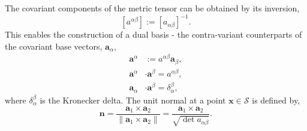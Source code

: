 \documentclass[../main.tex]{subfiles}
\begin{document}
The covariant components of the metric tensor can be obtained by its inversion,
\begin{equation}\label{contravar_metric_def}
    [a^{\alpha \beta}] := [a_{\alpha \beta}]^{-1}.
\end{equation}
This enables the construction of a dual basis - the contra-variant counterparts of the covariant base vectors, $\boldsymbol{a}_{\alpha}$,
\begin{align}\label{contravar_def}
    \boldsymbol{a}^{\alpha} &:= a^{\alpha \beta} \boldsymbol{a}_{\beta},\\
    \boldsymbol{a}^{\alpha} &\cdot \boldsymbol{a}^{\beta} = a^{\alpha \beta},\\
    \boldsymbol{a}_{\alpha} &\cdot \boldsymbol{a}^{\beta} = \delta^{\beta}_{\alpha},
\end{align}
where $\delta^{\beta}_{\alpha}$ is the Kronecker delta.
%
The unit normal at a point $\boldsymbol{x} \in \mathcal{S}$ is defined by,
\begin{equation}\label{normal}
    \boldsymbol{n} = \frac{\boldsymbol{a}_{1} \times \boldsymbol{a}_{2}}{\| \boldsymbol{a}_{1} \times \boldsymbol{a}_{2} \|}
    = \frac{\boldsymbol{a}_{1} \times \boldsymbol{a}_{2}}{\sqrt{\det a_{\alpha \beta}}}.
\end{equation}
\end{document}

